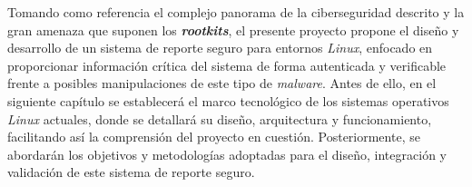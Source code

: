 \newpage

Tomando como referencia el complejo panorama de la ciberseguridad descrito y la gran amenaza que suponen los \textbf{\textit{rootkits}}, el presente proyecto propone el diseño y desarrollo de un sistema de reporte seguro para entornos \textit{Linux}, enfocado en proporcionar información crítica del sistema de forma autenticada y verificable frente a posibles manipulaciones de este tipo de \textit{malware}.
Antes de ello, en el siguiente capítulo se establecerá el marco tecnológico de los sistemas operativos \textit{Linux} actuales, donde se detallará su diseño, arquitectura y funcionamiento, facilitando así la comprensión del proyecto en cuestión.
Posteriormente, se abordarán los objetivos y metodologías adoptadas para el diseño, integración y validación de este sistema de reporte seguro.
